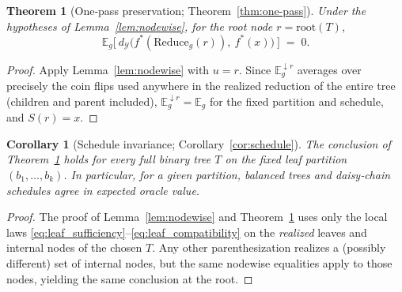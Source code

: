 \documentclass[11pt]{article}
\newtheorem{theorem}{Theorem}
\newtheorem{corollary}{Corollary}
\newcommand{\Y}{\mathcal{Y}}               %
\newcommand{\fstar}{f^*}               %
\newcommand{\E}{\mathbb{E}}
\newcommand{\metric}{d_{\Y}}
\newcommand{\reduce}{\text{Reduce}}
\newcommand{\reduceg}{\reduce_g}
\newcommand{\Eg}{\E_g}     %
\begin{document}
\begin{theorem}[One‑pass preservation; Theorem~\ref{thm:one-pass}]\label{thm:one-pass-appendix}
Under the hypotheses of Lemma~\ref{lem:nodewise}, for the root node $r=\mathrm{root}(T)$,
\[
\Eg\!\Big[\ \metric\!\big(\fstar(\reduceg(r)),\ \fstar(x)\big)\ \Big]\;=\;0.
\]
\end{theorem}

\begin{proof}
Apply Lemma~\ref{lem:nodewise} with $u=r$. Since $\Eg^{\downarrow r}$ averages over precisely the coin flips used anywhere in the realized reduction of the entire tree (children and parent included), $\Eg^{\downarrow r}=\Eg$ for the fixed partition and schedule, and $S(r)=x$.
\end{proof}

\begin{corollary}[Schedule invariance; Corollary~\ref{cor:schedule}]
\label{cor:schedule-appendix}
The conclusion of Theorem~\ref{thm:one-pass-appendix} holds for every full binary tree $T$ on the fixed leaf partition $(b_1,\dots,b_k)$. In particular, for a given partition, balanced trees and daisy‑chain schedules agree in expected oracle value.
\end{corollary}

\begin{proof}
The proof of Lemma~\ref{lem:nodewise} and Theorem~\ref{thm:one-pass-appendix} uses only the local laws \eqref{eq:leaf_sufficiency}–\eqref{eq:leaf_compatibility} on the \emph{realized} leaves and internal nodes of the chosen $T$. Any other parenthesization realizes a (possibly different) set of internal nodes, but the same nodewise equalities apply to those nodes, yielding the same conclusion at the root.
\end{proof}
\end{document}
